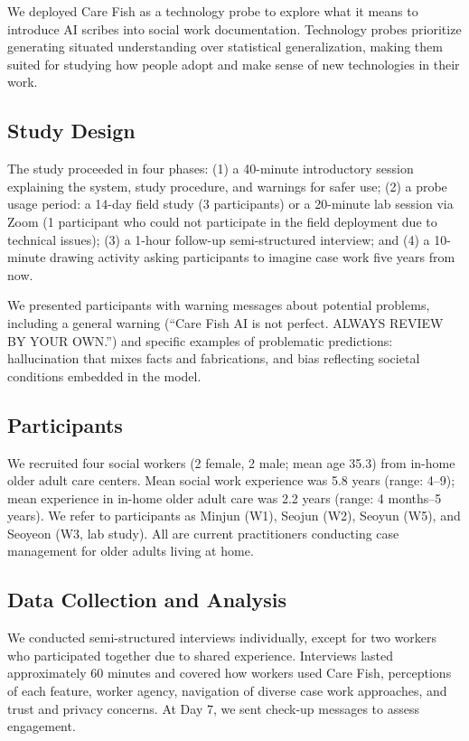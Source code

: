 \documentclass{article}
\begin{document}
We deployed Care Fish as a technology probe \citep{hutchinson2003technology} to explore what it means to introduce AI scribes into social work documentation. Technology probes prioritize generating situated understanding over statistical generalization, making them suited for studying how people adopt and make sense of new technologies in their work.

\subsection{Study Design}

The study proceeded in four phases: (1) a 40-minute introductory session explaining the system, study procedure, and warnings for safer use; (2) a probe usage period: a 14-day field study (3 participants) or a 20-minute lab session via Zoom (1 participant who could not participate in the field deployment due to technical issues); (3) a 1-hour follow-up semi-structured interview; and (4) a 10-minute drawing activity asking participants to imagine case work five years from now.

We presented participants with warning messages about potential problems, including a general warning (``Care Fish AI is not perfect. ALWAYS REVIEW BY YOUR OWN.'') and specific examples of problematic predictions: hallucination that mixes facts and fabrications, and bias reflecting societal conditions embedded in the model.

\subsection{Participants}

We recruited four social workers (2 female, 2 male; mean age 35.3) from in-home older adult care centers. Mean social work experience was 5.8 years (range: 4--9); mean experience in in-home older adult care was 2.2 years (range: 4 months--5 years). We refer to participants as Minjun (W1), Seojun (W2), Seoyun (W5), and Seoyeon (W3, lab study). All are current practitioners conducting case management for older adults living at home.

\subsection{Data Collection and Analysis}

We conducted semi-structured interviews individually, except for two workers who participated together due to shared experience. Interviews lasted approximately 60 minutes and covered how workers used Care Fish, perceptions of each feature, worker agency, navigation of diverse case work approaches, and trust and privacy concerns. At Day 7, we sent check-up messages to assess engagement.
\end{document}
